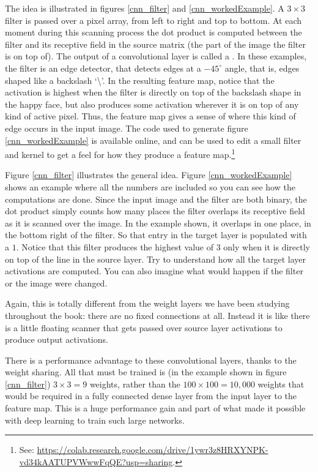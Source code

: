 The idea is illustrated in figures \ref{cnn_filter} and \ref{cnn_workedExample}. A $3 \times 3$ filter is passed over a pixel array, from left to right and top to bottom. At each moment during this scanning process the dot product is computed between the filter and its receptive field in the source matrix (the part of the image the filter is on top of). The output of a convolutional layer is called a . In these examples, the filter is an edge detector, that detects edges at a $-45^\circ$ angle, that is, edges shaped like a backslash `\textbackslash'. In the resulting feature map, notice that the activation is highest when the filter is directly on top of the backslash shape in the happy face, but also produces some activation wherever it is on top of any kind of active pixel. Thus, the feature map gives a sense of where this kind of edge occurs in the input image. The code used to generate figure \ref{cnn_workedExample} is available online, and can be used to edit a small filter and kernel to get a feel for how they produce a feature map.\footnote{See: \url{https://colab.research.google.com/drive/1ywr3z8HRXYNPK-vd34kAATUPVWwwFqQE?usp=sharing}.}

Figure \ref{cnn_filter} illustrates the general idea. Figure \ref{cnn_workedExample} shows an example where all the numbers are included so you can see how the computations are done. Since the input image and the filter are both binary, the dot product simply counts how many places the filter overlaps its receptive field as it is scanned over the image. In the example shown, it overlaps in one place, in the bottom right of the filter.  So that entry in the target layer is populated with a $1$.  Notice that this filter produces the highest value of $3$ only when it is directly on top of the line in the source layer. Try to understand how all the target layer activations are computed. You can also imagine what would happen if the filter or the image were changed.

Again, this is totally different from the weight layers we have been studying throughout the book: there are no fixed connections at all. Instead it is like there is a little floating scanner that gets passed over source layer activations to produce output activations. 

There is a performance advantage to these convolutional layers, thanks to the weight sharing. All that must be trained is (in the example shown in figure \ref{cnn_filter}) $3 \times 3=9$ weights, rather than the $100 \times 100 = 10,000$ weights that would be required in a fully connected dense layer from the input layer to the feature map. This is a huge performance gain and part of what  made it possible with deep learning to train such large networks.

